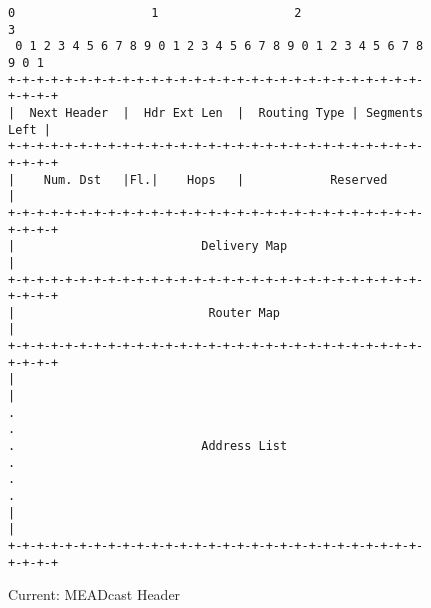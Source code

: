 \begin{figure}[h!]
\centering
\begin{lstlisting}[xleftmargin=.07\textwidth]
 0                   1                   2                   3
 0 1 2 3 4 5 6 7 8 9 0 1 2 3 4 5 6 7 8 9 0 1 2 3 4 5 6 7 8 9 0 1
+-+-+-+-+-+-+-+-+-+-+-+-+-+-+-+-+-+-+-+-+-+-+-+-+-+-+-+-+-+-+-+-+
|  Next Header  |  Hdr Ext Len  |  Routing Type | Segments Left |
+-+-+-+-+-+-+-+-+-+-+-+-+-+-+-+-+-+-+-+-+-+-+-+-+-+-+-+-+-+-+-+-+
|    Num. Dst   |Fl.|    Hops   |            Reserved           |
+-+-+-+-+-+-+-+-+-+-+-+-+-+-+-+-+-+-+-+-+-+-+-+-+-+-+-+-+-+-+-+-+
|                          Delivery Map                         |
+-+-+-+-+-+-+-+-+-+-+-+-+-+-+-+-+-+-+-+-+-+-+-+-+-+-+-+-+-+-+-+-+
|                           Router Map                          |
+-+-+-+-+-+-+-+-+-+-+-+-+-+-+-+-+-+-+-+-+-+-+-+-+-+-+-+-+-+-+-+-+
|                                                               |
.                                                               .
.                          Address List                         .
.                                                               .
|                                                               |
+-+-+-+-+-+-+-+-+-+-+-+-+-+-+-+-+-+-+-+-+-+-+-+-+-+-+-+-+-+-+-+-+

\end{lstlisting}
\caption{Current: MEADcast Header}
\end{figure}

